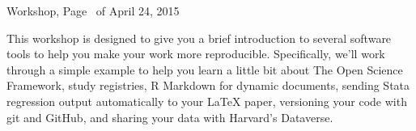 \documentclass[addpoints,10pt]{exam}
\begin{document}
\firstpageheadrule
{}
              {Workshop, Page \thepage\ of \numpages}
              {April 24, 2015}



This workshop is designed to give you a brief introduction to several software tools to help you make your work more reproducible. Specifically, we'll work through a simple example to help you learn a little bit about The Open Science Framework, study registries, R Markdown for dynamic documents, sending Stata regression output automatically to your LaTeX paper, versioning your code with git and GitHub, and sharing your data with Harvard's Dataverse.
\end{document}
